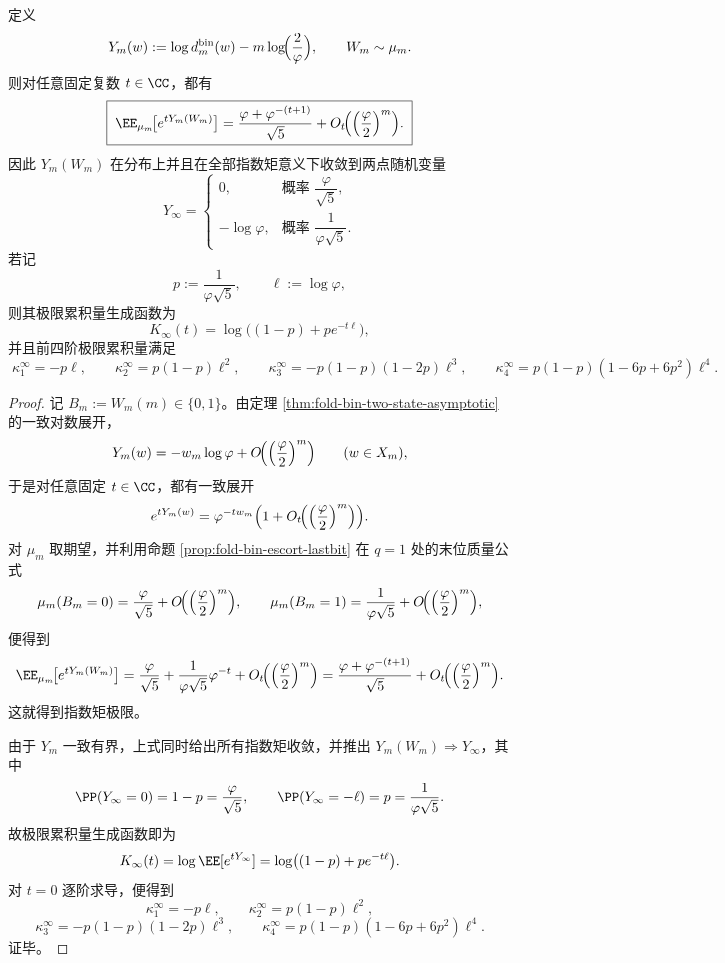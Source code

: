 \begin{theorem}[中心化对数多重度的全指数矩极限与全部累积量闭式]\label{thm:xi-time-part70ad-hidden-logmultiplicity-exponential-moments}
定义
\[
Y_m(w):=\log d_m^{\mathrm{bin}}(w)-m\log\!\Bigl(\frac{2}{\varphi}\Bigr),
\qquad
W_m\sim \mu_m.
\]
则对任意固定复数 \(t\in\CC\)，都有
\[
\boxed{\;
\EE_{\mu_m}\!\bigl[e^{tY_m(W_m)}\bigr]
=
\frac{\varphi+\varphi^{-(t+1)}}{\sqrt5}
+
O_t\!\Bigl(\Bigl(\frac{\varphi}{2}\Bigr)^m\Bigr).\;}
\]
因此 \(Y_m(W_m)\) 在分布上并且在全部指数矩意义下收敛到两点随机变量
\[
Y_\infty=
\begin{cases}
0,& \text{概率 } \dfrac{\varphi}{\sqrt5},\\[6pt]
-\log\varphi,& \text{概率 } \dfrac{1}{\varphi\sqrt5}.
\end{cases}
\]
若记
\[
p:=\frac{1}{\varphi\sqrt5},
\qquad
\ell:=\log\varphi,
\]
则其极限累积量生成函数为
\[
K_\infty(t)=\log\bigl((1-p)+pe^{-t\ell}\bigr),
\]
并且前四阶极限累积量满足
\[
\boxed{\;
\kappa_1^\infty=-p\ell,\qquad
\kappa_2^\infty=p(1-p)\ell^2,\qquad
\kappa_3^\infty=-p(1-p)(1-2p)\ell^3,\qquad
\kappa_4^\infty=p(1-p)(1-6p+6p^2)\ell^4.\;}
\]
\end{theorem}
\begin{proof}
记 \(B_m:=W_m(m)\in\{0,1\}\)。由定理 \ref{thm:fold-bin-two-state-asymptotic} 的一致对数展开，
\[
Y_m(w)=-w_m\log\varphi+O\!\Bigl(\Bigl(\frac{\varphi}{2}\Bigr)^m\Bigr)
\qquad (w\in X_m),
\]
于是对任意固定 \(t\in\CC\)，都有一致展开
\[
e^{tY_m(w)}
=
\varphi^{-t w_m}
\Bigl(1+O_t\!\Bigl(\Bigl(\frac{\varphi}{2}\Bigr)^m\Bigr)\Bigr).
\]
对 \(\mu_m\) 取期望，并利用命题 \ref{prop:fold-bin-escort-lastbit} 在 \(q=1\) 处的末位质量公式
\[
\mu_m(B_m=0)=\frac{\varphi}{\sqrt5}+O\!\Bigl(\Bigl(\frac{\varphi}{2}\Bigr)^m\Bigr),
\qquad
\mu_m(B_m=1)=\frac{1}{\varphi\sqrt5}+O\!\Bigl(\Bigl(\frac{\varphi}{2}\Bigr)^m\Bigr),
\]
便得到
\[
\EE_{\mu_m}\!\bigl[e^{tY_m(W_m)}\bigr]
=
\frac{\varphi}{\sqrt5}
+
\frac{1}{\varphi\sqrt5}\varphi^{-t}
+
O_t\!\Bigl(\Bigl(\frac{\varphi}{2}\Bigr)^m\Bigr)
=
\frac{\varphi+\varphi^{-(t+1)}}{\sqrt5}
+
O_t\!\Bigl(\Bigl(\frac{\varphi}{2}\Bigr)^m\Bigr).
\]
这就得到指数矩极限。

由于 \(Y_m\) 一致有界，上式同时给出所有指数矩收敛，并推出 \(Y_m(W_m)\Rightarrow Y_\infty\)，其中
\[
\PP(Y_\infty=0)=1-p=\frac{\varphi}{\sqrt5},
\qquad
\PP(Y_\infty=-\ell)=p=\frac{1}{\varphi\sqrt5}.
\]
故极限累积量生成函数即为
\[
K_\infty(t)=\log\EE[e^{tY_\infty}]
=
\log\bigl((1-p)+pe^{-t\ell}\bigr).
\]
对 \(t=0\) 逐阶求导，便得到
\[
\kappa_1^\infty=-p\ell,
\qquad
\kappa_2^\infty=p(1-p)\ell^2,
\]
\[
\kappa_3^\infty=-p(1-p)(1-2p)\ell^3,
\qquad
\kappa_4^\infty=p(1-p)(1-6p+6p^2)\ell^4.
\]
证毕。
\end{proof}


